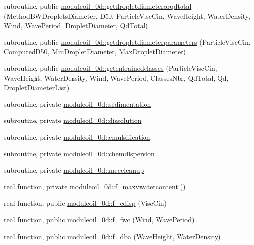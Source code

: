 \begin{DoxyCompactItemize}
\item 
subroutine, public \mbox{\hyperlink{namespacemoduleoil__0d_a2282beabe04942e12608b16eecc58ffe}{moduleoil\+\_\+0d\+::getdropletdiameterorqdtotal}} (Method\+B\+W\+Droplets\+Diameter, D50, Particle\+Visc\+Cin, Wave\+Height, Water\+Density, Wind, Wave\+Period, Droplet\+Diameter, Qd\+Total)
\item 
subroutine, public \mbox{\hyperlink{namespacemoduleoil__0d_a5770405ab41d32282fda45ba2d2750ef}{moduleoil\+\_\+0d\+::getdropletdiameterparameters}} (Particle\+Visc\+Cin, Computed\+D50, Min\+Droplet\+Diameter, Max\+Droplet\+Diameter)
\item 
subroutine, public \mbox{\hyperlink{namespacemoduleoil__0d_a3dc497493c2537b1f55d043f488bcb36}{moduleoil\+\_\+0d\+::getentrainedclasses}} (Particle\+Visc\+Cin, Wave\+Height, Water\+Density, Wind, Wave\+Period, Classes\+Nbr, Qd\+Total, Qd, Droplet\+Diameter\+List)
\item 
subroutine, private \mbox{\hyperlink{namespacemoduleoil__0d_a45b30490a7ce5da933ae0f54cfea07d9}{moduleoil\+\_\+0d\+::sedimentation}}
\item 
subroutine, private \mbox{\hyperlink{namespacemoduleoil__0d_a5b8886545b16a4515a2adcc5ae3f6573}{moduleoil\+\_\+0d\+::dissolution}}
\item 
subroutine, private \mbox{\hyperlink{namespacemoduleoil__0d_acae01578d384bd637cbfb5b788022edc}{moduleoil\+\_\+0d\+::emulsification}}
\item 
subroutine, private \mbox{\hyperlink{namespacemoduleoil__0d_a0572ecc4d1cd6504abb835636eeb8f26}{moduleoil\+\_\+0d\+::chemdispersion}}
\item 
subroutine, private \mbox{\hyperlink{namespacemoduleoil__0d_a44f803669a7c3e8a5a116008eb987343}{moduleoil\+\_\+0d\+::meccleanup}}
\item 
real function, private \mbox{\hyperlink{namespacemoduleoil__0d_acf1e57739fa15b9c76feeec263af3ff1}{moduleoil\+\_\+0d\+::f\+\_\+maxvwatercontent}} ()
\item 
real function, public \mbox{\hyperlink{namespacemoduleoil__0d_aec999ef14a345781bcc8300cd1c2999f}{moduleoil\+\_\+0d\+::f\+\_\+cdisp}} (Visc\+Cin)
\item 
real function, public \mbox{\hyperlink{namespacemoduleoil__0d_a61a73c3b473d2b0773d7812c5c93cea0}{moduleoil\+\_\+0d\+::f\+\_\+fwc}} (Wind, Wave\+Period)
\item 
real function, public \mbox{\hyperlink{namespacemoduleoil__0d_a4505ef2294ae0f155df322a4eac4bf20}{moduleoil\+\_\+0d\+::f\+\_\+dba}} (Wave\+Height, Water\+Density)

\end{DoxyCompactItemize}
